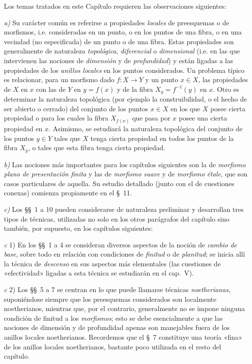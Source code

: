 \clearpage
{}

Los temas tratados en este Capítulo requieren las observaciones siguientes:

\medskip
\noindent
\emph{a)} Su carácter común es referirse a propiedades
\emph{locales} de preesquemas o de morfismos, i.e. consideradas en un punto,
o en los puntos de una fibra, o en una vecindad (no especificada) de un punto o
de una fibra. Estas propiedades son generalmente de naturaleza \emph{topológica},
\emph{diferencial} o \emph{dimensional} (i.e. en las que intervienen las
nociones de \emph{dimensión} y de \emph{profundidad}) y están ligadas a las
propiedades de los \emph{anillos locales} en los puntos considerados. Un problema típico
es relacionar, para un morfismo dado $f:X\to Y$ y un punto
$x\in X$, las propiedades de $X$ en $x$ con las de $Y$ en $y=f(x)$ y de
la fibra $X_y=f^{-1}(y)$ en $x$. Otro es determinar la naturaleza
topológica (por ejemplo la construibilidad, o el hecho de ser abierto o
cerrado) del conjunto de los puntos $x\in X$ en los que $X$ posee cierta
propiedad o para los cuales la fibra $X_{f(x)}$ que pasa por $x$ posee una
cierta propiedad en $x$. Asimismo, se estudiará la naturaleza topológica
del conjunto de los puntos $y\in Y$ tales que $X$ tenga cierta propiedad en
todos los puntos de la fibra $X_y$, o tales que esta fibra tenga cierta
propiedad.

\medskip
\noindent
\emph{b)} Las nociones más importantes para los capítulos siguientes son
la de \emph{morfismo plano de presentación finita} y las de
\emph{morfismo suave} y de \emph{morfismo étale}, que son casos
particulares de aquella. Su estudio detallado (junto con el de cuestiones conexas)
comienza propiamente en el §~11.

\medskip
\noindent
\emph{c)} Los §§~1 a 10 pueden considerarse de naturaleza preliminar
y desarrollan tres tipos de técnicas, utilizadas no solo en los
otros parágrafos del capítulo sino también, por supuesto, en los capítulos
siguientes:

\medskip
\noindent
\emph{c} 1) En los §§~1 a 4 se consideran diversos aspectos de la noción de
\emph{cambio de base}, sobre todo en relación con condiciones de
\emph{finitud} o de \emph{planitud}; se inicia allí la técnica de
\emph{descenso} en sus aspectos más elementales (las cuestiones
de «efectividad» ligadas a esta técnica se estudiarán en el cap.~V).

\medskip
\noindent
\emph{c} 2) Los §§~5 a 7 se centran en lo que puede llamarse
técnicas \emph{noetherianas}, suponiéndose siempre que los preesquemas considerados
son localmente noetherianos, mientras que, por el contrario, generalmente no se
impone ninguna condición de finitud a los \emph{morfismos}; esto se debe
esencialmente a que las nociones de dimensión y de profundidad apenas son
manejables fuera de los anillos locales noetherianos. Recordemos que el §~7
constituye una teoría «fina» de los anillos locales noetherianos, bastante poco
utilizada en el resto del capítulo.

